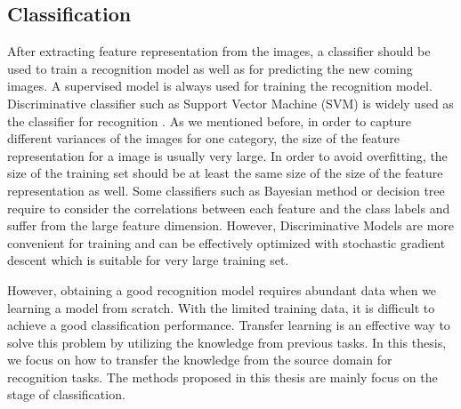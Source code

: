 \subsection{Classification}
After extracting feature representation from the images, a classifier should be used to train a recognition model as well as for predicting the new coming images. A supervised model is always used for training the recognition model. Discriminative classifier such as Support Vector Machine (SVM) is widely used as the classifier for recognition \cite{cristianini2000introduction}. As we mentioned before, in order to capture different variances of the images for one category, the size of the feature representation for a image is usually very large. In order to avoid overfitting, the size of the training set should be at least the same size of the size of the feature representation as well. Some classifiers such as Bayesian method or decision tree require to consider the correlations between each feature and the class labels and suffer from the large feature dimension. However, Discriminative Models\cite{bottou2010large} are more convenient for training and can be effectively optimized with stochastic gradient descent which is suitable for very large training set. 

However, obtaining a good recognition model requires abundant data when we learning a model from scratch. With the limited training data, it is difficult to achieve a good classification performance. Transfer learning is an effective way to solve this problem by utilizing the knowledge from previous tasks. In this thesis, we focus on how to transfer the knowledge from the source domain for recognition tasks. The methods proposed in this thesis are mainly focus on the stage of classification. %




